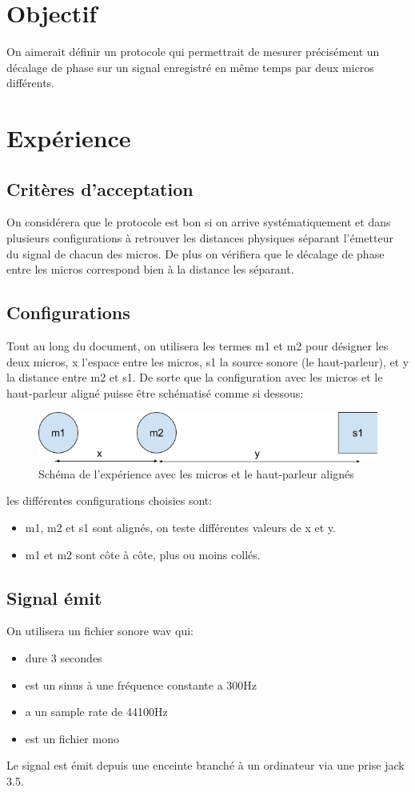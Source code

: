 \documentclass[12pt,a4paper]{report}
\begin{document}
\section{Objectif}
On aimerait définir un protocole qui permettrait de mesurer précisément un décalage de phase sur un signal enregistré en même temps par deux micros différents.


\section{Expérience}
\subsection{Critères d'acceptation}
On considérera que le protocole est bon si on arrive systématiquement et dans plusieurs configurations à retrouver les distances physiques séparant l'émetteur du signal de chacun des micros. De plus on vérifiera que le décalage de phase entre les micros correspond bien à la distance les séparant.

\subsection{Configurations}
Tout au long du document, on utilisera les termes m1 et m2 pour désigner les deux micros, x l'espace entre les micros, s1 la source sonore (le haut-parleur), et y la distance entre m2 et s1. De sorte que la configuration avec les micros et le haut-parleur aligné puisse être schématisé comme si dessous:
\begin{figure}[H]
\includegraphics[width=\textwidth]{../tests/test_du_protocole/schema.png} 
\caption{Schéma de l'expérience avec les micros et le haut-parleur alignés}
\end{figure}
les différentes configurations choisies sont:
\begin{itemize}
\item m1, m2 et s1 sont alignés, on teste différentes valeurs de x et y.
\item m1 et m2 sont côte à côte, plus ou moins collés.
\end{itemize}
\subsection{Signal émit}
On utilisera un fichier sonore wav qui:
\begin{itemize}
\item dure 3 secondes
\item est un sinus à une fréquence constante a 300Hz
\item a un sample rate de 44100Hz
\item est un fichier mono
\end{itemize}
Le signal est émit depuis une enceinte branché à un ordinateur via une prise jack 3.5.
\end{document}
